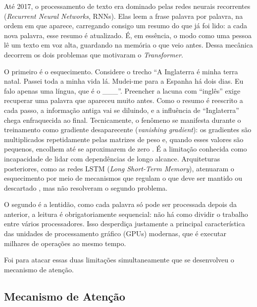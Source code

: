 Até 2017, o processamento de texto era dominado pelas redes neurais recorrentes
(\textit{Recurrent Neural Networks}, RNNs). Elas leem a frase palavra por palavra, na
ordem em que aparece, carregando consigo um resumo do que já foi lido: a cada nova
palavra, esse resumo é atualizado. É, em essência, o modo como uma pessoa lê um texto em
voz alta, guardando na memória o que veio antes. Dessa mecânica decorrem os dois
problemas que motivaram o \textit{Transformer}.

O primeiro é o esquecimento. Considere o trecho ``A Inglaterra é minha terra
natal. Passei toda a minha vida lá. Mudei-me para a Espanha há dois dias. Eu falo apenas
uma língua, que é o \_\_\_''. Preencher a lacuna com ``inglês'' exige recuperar uma
palavra que apareceu muito antes. Como o resumo é reescrito a cada passo, a informação
antiga vai se diluindo, e a influência de ``Inglaterra'' chega enfraquecida ao final.
Tecnicamente, o fenômeno se manifesta durante o treinamento como gradiente desaparecente
(\textit{vanishing gradient}): os gradientes são multiplicados repetidamente pelas
matrizes de peso e, quando esses valores são pequenos, encolhem até se aproximarem de zero
\cite{Bengio1994}. É a limitação conhecida como incapacidade de lidar com
dependências de longo alcance. Arquiteturas posteriores, como as redes LSTM
(\textit{Long Short-Term Memory}), atenuaram o esquecimento por meio de mecanismos que
regulam o que deve ser mantido ou descartado \cite{Hochreiter1997}, mas não resolveram o
segundo problema.

O segundo é a lentidão, como cada
palavra só pode ser processada depois da anterior, a leitura é obrigatoriamente
sequencial: não há como dividir o trabalho entre vários processadores. Isso desperdiça
justamente a principal característica das unidades de processamento gráfico (GPUs)
modernas, que é executar milhares de operações ao mesmo tempo. 

Foi para atacar essas duas limitações simultaneamente que se desenvolveu o mecanismo de
atenção.


\subsection{Mecanismo de Atenção}\label{subsec:atencao}

